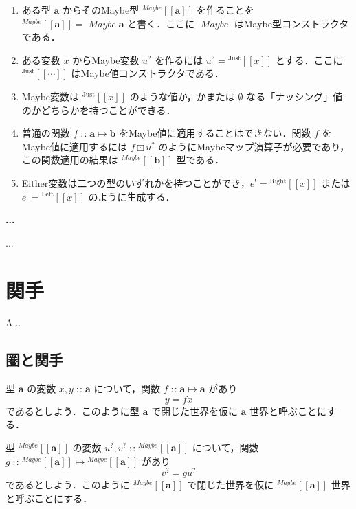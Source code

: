 \documentclass[a4paper,twocolumn]{jsbook}
\def\[{\left[\!\left[}
\def\]{\right]\!\right]}
\newenvironment{leader}{\begingroup\gt}{\endgroup}
\newenvironment{note}[1]{\begin{boxnote}\begin{center}\textbf{#1}\end{center}}{\end{boxnote}}
\newcommand{\mNothing}{\emptyset}
\DeclareMathOperator{\mIn}{{:\!:}}
\DeclareMathOperator{\mMapMaybe}{\boxdot}
\DeclareMathOperator{\mMapsTo}{\mapsto}
\newcommand{\mSpecialSub}[1]{\text{#1}}
\newcommand{\mLeft}{\mSpecialSub{Left}}
\newcommand{\mRight}{\mSpecialSub{Right}}
\newcommand{\mType}[1]{\mathbf{#1}}
\newcommand{\mTypeConstructor}[1]{\textit{#1}}
\DeclareMathOperator{\mMaybeTypeConstructor}{\mTypeConstructor{Maybe}}
\newcommand{\mGenericTypeAssemble}[2]{{}^{\mTypeConstructor{#1}}\[\mType{#2}\]}
\newcommand{\mMaybeType}[1]{\mGenericTypeAssemble{Maybe}{#1}}
\newcommand{\mGenericValueConstructor}[1]{\mathrm{#1}}
\newcommand{\mGenericWith}[2]{{}^\mGenericValueConstructor{#1}\[#2\]}
\newcommand{\mLeftWith}[1]{\mGenericWith{\mLeft}{#1}}
\newcommand{\mRightWith}[1]{\mGenericWith{\mRight}{#1}}
\newcommand{\mJustWith}[1]{\mGenericWith{Just}{#1}}
\newcommand{\mEither}[1]{{#1}^!}
\newcommand{\mMaybe}[1]{{#1}^?}
\newcommand{\mProj}[2]{#1\mMapsTo#2}
\begin{document}
\begin{enumerate}
\item ある型 $\mType{a}$ からそのMaybe型 $\mMaybeType{a}$ を作ることを $\mMaybeType{a}=\mMaybeTypeConstructor\mType{a}$ と書く．ここに $\mMaybeTypeConstructor$ はMaybe型コンストラクタである．
\item ある変数 $x$ からMaybe変数 $\mMaybe{u}$ を作るには $\mMaybe{u}=\mJustWith{x}$ とする．ここに $\mJustWith{\dotsb}$ はMaybe値コンストラクタである．
\item Maybe変数は $\mJustWith{x}$ のような値か，かまたは $\mNothing$ なる「ナッシング」値のかどちらかを持つことができる．
\item 普通の関数 $f\mIn\mProj{\mType{a}}{\mType{b}}$ をMaybe値に適用することはできない．関数 $f$ をMaybe値に適用するには $f\mMapMaybe\mMaybe{u}$ のようにMaybeマップ演算子が必要であり，この関数適用の結果は $\mMaybeType{b}$ 型である．
\item Either変数は二つの型のいずれかを持つことができ，$\mEither{e}=\mRightWith{x}$ または $\mEither{e}=\mLeftWith{x}$ のように生成する．
\end{enumerate}

\begin{note}{...}
...
\end{note}


\chapter{関手}
\label{ch:functor}

\begin{leader}
A...
\end{leader}

\section{圏と関手}

型 $\mType{a}$ の変数 $x,y\mIn\mType{a}$ について，関数 $f\mIn\mProj{\mType{a}}{\mType{a}}$ があり
\begin{equation}
y=fx
\end{equation}
であるとしよう．このように型 $\mType{a}$ で閉じた世界を仮に $\mType{a}$ 世界と呼ぶことにする．

型 $\mMaybeType{a}$ の変数 $\mMaybe{u},\mMaybe{v}\mIn\mMaybeType{a}$ について，関数 $g\mIn\mProj{\mMaybeType{a}}{\mMaybeType{a}}$ があり
\begin{equation}
\mMaybe{v}=g\mMaybe{u}
\end{equation}
であるとしよう．このように $\mMaybeType{a}$ で閉じた世界を仮に $\mMaybeType{a}$ 世界と呼ぶことにする．
\end{document}

